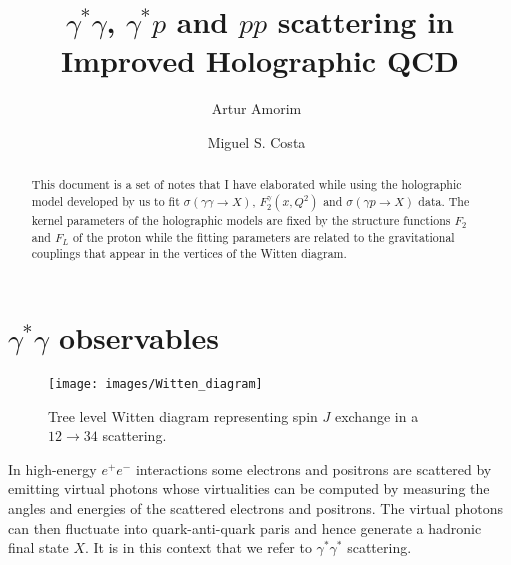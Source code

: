 \documentclass[preprint, 12pt]{elsarticle}
\begin{document}
\begin{frontmatter}

\title{$\gamma^* \gamma$, $\gamma^* p$ and $pp$ scattering in Improved Holographic QCD}

\author[ath]{Artur Amorim~}
\author[ath]{Miguel S. Costa~}
\address[ath]{Centro de F\'{\i}sica do Porto e Departamento de F\'{\i}sica e Astronomia da Faculdade de Ci\^encias da Universidade do Porto, Rua do Campo Alegre 687, 4169-007 Porto, Portugal}


\begin{abstract}

This document is a set of notes that I have elaborated while using the holographic model developed by us to fit $\sigma\left(\gamma \gamma \rightarrow X\right)$, $F_2^\gamma\left(x, Q^2\right)$ and $\sigma\left(\gamma p \rightarrow X\right)$ data. The kernel parameters of the holographic models are fixed by the structure functions $F_2$ and $F_L$ of the proton while the fitting parameters are related to the gravitational couplings that appear in the vertices of the Witten diagram.

\end{abstract}

\end{frontmatter}

\section{$\gamma^{*}\gamma$ observables}
\begin{figure}[!h]
  \center
  \texttt{[image: images/Witten\_diagram]} 
  \caption{Tree level Witten diagram representing spin $J$    exchange in a $12\to34$ scattering. 
}
  \label{fig:Witten_diagram}
\end{figure}

In high-energy $e^{+}e^{-}$ interactions some electrons and positrons are scattered by emitting virtual photons whose virtualities can be computed by measuring the angles and energies of the scattered electrons and positrons. The virtual photons can then fluctuate into quark-anti-quark paris and hence generate a hadronic final state $X$. It is in this context that we refer to $\gamma^{*} \gamma^{*}$ scattering.
\end{document}
